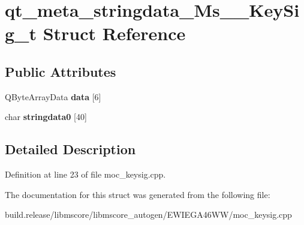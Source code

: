 \hypertarget{structqt__meta__stringdata___ms_____key_sig__t}{}\section{qt\+\_\+meta\+\_\+stringdata\+\_\+\+Ms\+\_\+\+\_\+\+Key\+Sig\+\_\+t Struct Reference}
\label{structqt__meta__stringdata___ms_____key_sig__t}
\subsection*{Public Attributes}
\begin{DoxyCompactItemize}
\item 
\mbox{\label{structqt__meta__stringdata___ms_____key_sig__t_a1c8e51f281ced701fa249d7673526c43}} 
Q\+Byte\+Array\+Data {\bfseries data} \mbox{[}6\mbox{]}
\item 
\mbox{\label{structqt__meta__stringdata___ms_____key_sig__t_a6ebb0b0437420a277c092547f0c1e2ff}} 
char {\bfseries stringdata0} \mbox{[}40\mbox{]}
\end{DoxyCompactItemize}


\subsection{Detailed Description}


Definition at line 23 of file moc\+\_\+keysig.\+cpp.



The documentation for this struct was generated from the following file\+:\begin{DoxyCompactItemize}
\item 
build.\+release/libmscore/libmscore\+\_\+autogen/\+E\+W\+I\+E\+G\+A46\+W\+W/moc\+\_\+keysig.\+cpp\end{DoxyCompactItemize}
